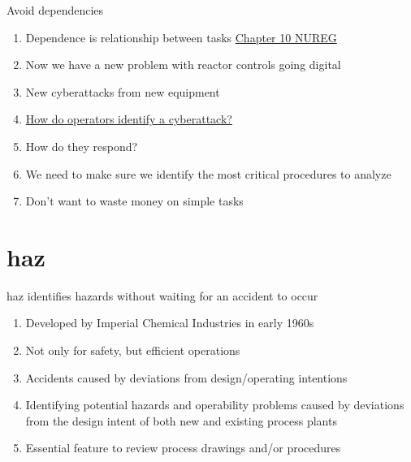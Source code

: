 \documentclass[aspectratio=1610,pdftex,dvipsnames,compress,xcolor={dvipsnames}]{beamer}
\newcommand{\acs}{\acrshort} %
\begin{document}
\addtocounter{framenumber}{-1}
\begin{frame}{Avoid dependencies}
    \begin{enumerate}[series=outerlist,topsep=0pt,itemsep=15pt,leftmargin=*,label=(\arabic*)]
        \item[]Dependence is relationship between tasks \href{https://uidaho.pressbooks.pub/riskassessment/chapter/human-reliability-analysis/}{Chapter 10 NUREG}
        \item[]Now we have a new problem with reactor controls going digital
        \item[]New cyberattacks from new equipment  
        \item[]\href{https://www.sciencedirect.com/science/article/abs/pii/S0149197023001774}{How do operators identify a cyberattack?}
        \item[]How do they respond?  
        \item[]We need to make sure we identify the most critical procedures to analyze
        \item[]Don't want to waste money on simple tasks
    \end{enumerate}
\end{frame}


\section{\acs{haz}}


\addtocounter{framenumber}{-1}
\begin{frame}{\acs{haz} identifies hazards without waiting for an accident to occur}
    \begin{enumerate}[series=outerlist,topsep=0pt,itemsep=21pt,leftmargin=*,label=(\arabic*)]
        \item[]Developed by Imperial Chemical Industries in early 1960s
        \item[]Not only for safety, but efficient operations
        \item[]Accidents caused by deviations from design/operating intentions
        \item[]Identifying potential hazards and operability problems caused by deviations from the design intent of both new and existing process plants
        \item[]Essential feature to review process drawings and/or procedures
    \end{enumerate}
\end{frame}
\end{document}
